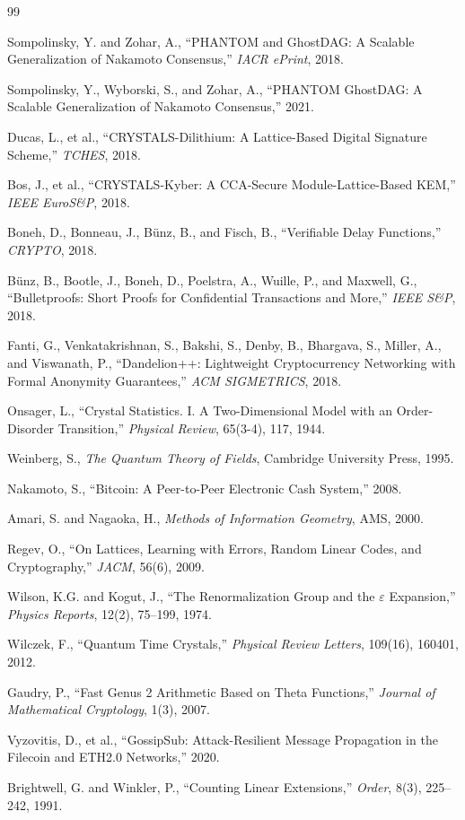 \documentclass[12pt,a4paper,twocolumn]{article}
\begin{document}
\begin{thebibliography}{99}

 Sompolinsky, Y. and Zohar, A., ``PHANTOM and GhostDAG: A Scalable Generalization of Nakamoto Consensus,'' \emph{IACR ePrint}, 2018.

 Sompolinsky, Y., Wyborski, S., and Zohar, A., ``PHANTOM GhostDAG: A Scalable Generalization of Nakamoto Consensus,'' 2021.

 Ducas, L., et al., ``CRYSTALS-Dilithium: A Lattice-Based Digital Signature Scheme,'' \emph{TCHES}, 2018.

 Bos, J., et al., ``CRYSTALS-Kyber: A CCA-Secure Module-Lattice-Based KEM,'' \emph{IEEE EuroS\&P}, 2018.

 Boneh, D., Bonneau, J., B{\"u}nz, B., and Fisch, B., ``Verifiable Delay Functions,'' \emph{CRYPTO}, 2018.

 B{\"u}nz, B., Bootle, J., Boneh, D., Poelstra, A., Wuille, P., and Maxwell, G., ``Bulletproofs: Short Proofs for Confidential Transactions and More,'' \emph{IEEE S\&P}, 2018.

 Fanti, G., Venkatakrishnan, S., Bakshi, S., Denby, B., Bhargava, S., Miller, A., and Viswanath, P., ``Dandelion++: Lightweight Cryptocurrency Networking with Formal Anonymity Guarantees,'' \emph{ACM SIGMETRICS}, 2018.

 Onsager, L., ``Crystal Statistics. I. A Two-Dimensional Model with an Order-Disorder Transition,'' \emph{Physical Review}, 65(3-4), 117, 1944.

 Weinberg, S., \emph{The Quantum Theory of Fields}, Cambridge University Press, 1995.

 Nakamoto, S., ``Bitcoin: A Peer-to-Peer Electronic Cash System,'' 2008.

 Amari, S. and Nagaoka, H., \emph{Methods of Information Geometry}, AMS, 2000.

 Regev, O., ``On Lattices, Learning with Errors, Random Linear Codes, and Cryptography,'' \emph{JACM}, 56(6), 2009.

 Wilson, K.G. and Kogut, J., ``The Renormalization Group and the $\varepsilon$ Expansion,'' \emph{Physics Reports}, 12(2), 75--199, 1974.

 Wilczek, F., ``Quantum Time Crystals,'' \emph{Physical Review Letters}, 109(16), 160401, 2012.

 Gaudry, P., ``Fast Genus 2 Arithmetic Based on Theta Functions,'' \emph{Journal of Mathematical Cryptology}, 1(3), 2007.

 Vyzovitis, D., et al., ``GossipSub: Attack-Resilient Message Propagation in the Filecoin and ETH2.0 Networks,'' 2020.

 Brightwell, G. and Winkler, P., ``Counting Linear Extensions,'' \emph{Order}, 8(3), 225--242, 1991.

\end{thebibliography}
\end{document}
